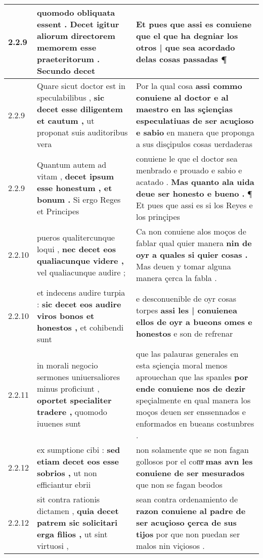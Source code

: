 \begin{tabular}{|p{1cm}|p{6.5cm}|p{6.5cm}|}
2.2.9 & quomodo obliquata essent . \textbf{ Decet igitur aliorum directorem memorem esse praeteritorum . } Secundo decet & Et pues que assi es conuiene \textbf{ que el que ha degniar los otros | que sea acordado delas cosas passadas } ¶ \\\hline
2.2.9 & Quare sicut doctor est in speculabilibus , \textbf{ sic decet esse diligentem et cautum , } ut proponat suis auditoribus vera & Por la qual cosa \textbf{ assi commo conuiene al doctor e al maestro en las sçiençias especulatiuas de ser acuçioso e sabio } en manera que proponga a sus disçipulos cosas uerdaderas \\\hline
2.2.9 & Quantum autem ad vitam , \textbf{ decet ipsum esse honestum , et bonum . } Si ergo Reges et Principes & conuiene le que el doctor sea menbrado e prouado e sabio e acatado . \textbf{ Mas quanto ala uida deue ser honesto e bueno . } ¶ Et pues que assi es si los Reyes e los prinçipes \\\hline
2.2.10 & pueros qualitercunque loqui , \textbf{ nec decet eos qualiacunque videre , } vel qualiacunque audire ; & Ca non conuiene alos moços de fablar qual quier manera \textbf{ nin de oyr a quales si quier cosas . } Mas deuen y tomar alguna manera çerca la fabla . \\\hline
2.2.10 & et indecens audire turpia : \textbf{ sic decet eos audire viros bonos et honestos , } et cohibendi sunt & e desconuenible de oyr cosas torpes \textbf{ assi les | conuienea ellos de oyr a bueons omes e honestos } e son de refrenar \\\hline
2.2.11 & in morali negocio sermones uniuersaliores minus proficiunt , \textbf{ oportet specialiter tradere , } quomodo iuuenes sunt & que las palauras generales en esta sçiençia moral menos aprouechan que las spanles \textbf{ por ende conuiene nos de dezir } speçialmente en qual manera los moços deuen ser enssennados e enformados en bueans costunbres . \\\hline
2.2.12 & ex sumptione cibi : \textbf{ sed etiam decet eos esse sobrios , } ut non efficiantur ebrii & non solamente que se non fagan gollosos por el comͣ \textbf{ mas avn les conuiene de ser mesurados } que non se fagan beodos \\\hline
2.2.12 & sit contra rationis dictamen , \textbf{ quia decet patrem sic solicitari erga filios , } ut sint virtuosi , & sean contra ordenamiento de \textbf{ razon conuiene al padre de ser acuçioso çerca de sus tijos } por que non puedan ser malos nin viçiosos . \\\hline

\end{tabular}
